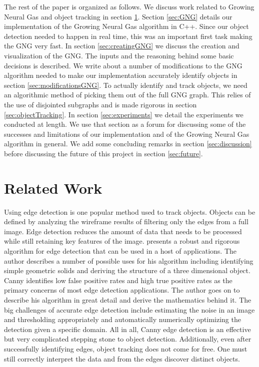 \documentclass{article}
\renewcommand{\|}{\origbar} %
\begin{document}
The rest of the paper is organized as follows. We discuss work related to Growing Neural Gas and object tracking in section \ref{sec:relatedWork}. Section \ref{sec:GNG} details our implementation of the Growing Neural Gas algorithm in C++. Since our object detection needed to happen in real time, this was an important first task making the GNG very fast. In section \ref{sec:creatingGNG} we discuss the creation and visualization of the GNG. The inputs and the reasoning behind some basic decisions is described. We write about a number of modifications to the GNG algorithm needed to make our implementation accurately identify objects in section \ref{sec:modificationsGNG}. To actually identify and track objects, we need an algorithmic method of picking them out of the full GNG graph. This relies of the use of disjointed subgraphs and is made rigorous in section \ref{sec:objectTracking}. In section \ref{sec:experiments} we detail the experiments we conducted at length. We use that section as a forum for discussing some of the successes and limitations of our implementation and of the Growing Neural Gas algorithm in general. We add some concluding remarks in section \ref{sec:discussion} before discussing the future of this project in section \ref{sec:future}.

\section{Related Work}
\label{sec:relatedWork}


Using edge detection is one popular method used to track objects. Objects can be defined by analyzing the wireframe results of filtering only the edges from a full image. Edge detection reduces the amount of data that needs to be processed while still retaining key features of the image.  presents a robust and rigorous algorithm for edge detection that can be used in a host of applications. The author describes a number of possible uses for his algorithm including identifying simple geometric solids and deriving the structure of a three dimensional object. Canny identifies low false positive rates and high true positive rates as the primary concerns of most edge detection applications. The author goes on to describe his algorithm in great detail and derive the mathematics behind it. The big challenges of accurate edge detection include estimating the noise in an image and thresholding appropriately and automatically numerically optimizing the detection given a specific domain. All in all, Canny edge detection is an effective but very complicated stepping stone to object detection. Additionally, even after successfully identifying edges, object tracking does not come for free. One must still correctly interpret the data and from the edges discover distinct objects.
\end{document}
